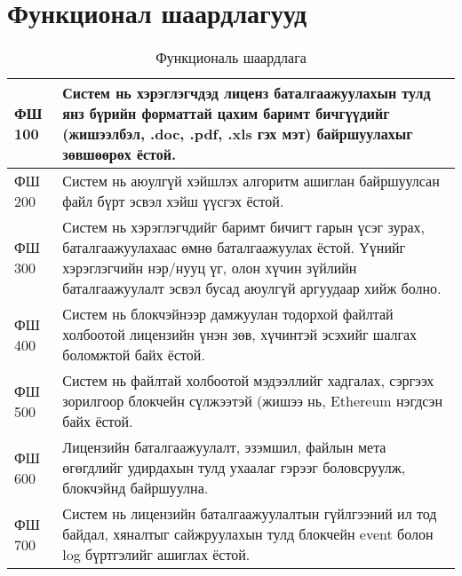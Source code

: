 \section{Функционал шаардлагууд}
\begin{table}[h]
	\centering
	\begin{tabular}{ |p{2cm}|p{13cm}| }
		ФШ 100 & Систем нь хэрэглэгчдэд лиценз баталгаажуулахын тулд янз бүрийн форматтай цахим баримт бичгүүдийг (жишээлбэл, .doc, .pdf, .xls гэх мэт) байршуулахыг зөвшөөрөх ёстой. \\ \hline
      ФШ 200 & Систем нь аюулгүй хэйшлэх алгоритм ашиглан байршуулсан файл бүрт  эсвэл хэйш үүсгэх ёстой. \\ \hline
		ФШ 300 & Систем нь хэрэглэгчдийг баримт бичигт гарын үсэг зурах, баталгаажуулахаас өмнө баталгаажуулах ёстой. Үүнийг хэрэглэгчийн нэр/нууц үг, олон хүчин зүйлийн баталгаажуулалт эсвэл бусад аюулгүй аргуудаар хийж болно. \\ \hline
		ФШ 400 & Систем нь блокчэйнээр дамжуулан тодорхой файлтай холбоотой лицензийн үнэн зөв, хүчинтэй эсэхийг шалгах боломжтой байх ёстой. \\ \hline
		ФШ 500 & Систем нь файлтай холбоотой мэдээллийг хадгалах, сэргээх зорилгоор блокчейн сүлжээтэй (жишээ нь, Ethereum нэгдсэн байх ёстой. \\  \hline
		ФШ 600 & Лицензийн баталгаажуулалт, эзэмшил, файлын мета өгөгдлийг удирдахын тулд ухаалаг гэрээг боловсруулж, блокчэйнд байршуулна. \\  \hline
		ФШ 700 & Систем нь лицензийн баталгаажуулалтын гүйлгээний ил тод байдал, хяналтыг сайжруулахын тулд блокчейн event болон log бүртгэлийг ашиглах ёстой. \\  \hline
	\end{tabular}
   \caption{Функциональ шаардлага}
\end{table}


